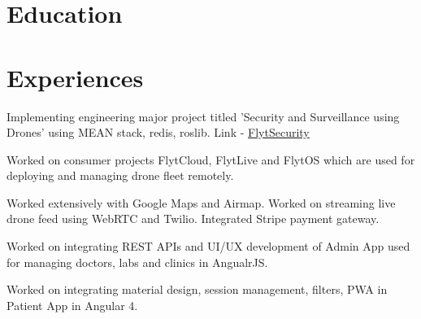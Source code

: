 \documentclass[]{deedy-resume-openfont}
\begin{document}
    \hfill
    \begin{minipage}[t]{0.66\textwidth} 
    
    
    \section{Education}
    
     \newline
    \vspace{\topsep}
    \sectionsep
    
    
    \sectionsep
    
    
    
    \section{Experiences}
    \vspace{3mm}
    \begin{tightemize}
    \item Implementing engineering major project titled 'Security and Surveillance using Drones' using MEAN stack, redis, roslib. Link - \href{https://flytsecurity.ai/}{FlytSecurity} 
     \item Worked on consumer projects FlytCloud, FlytLive and FlytOS which are used for deploying and managing drone fleet remotely. 
     \item Worked extensively with Google Maps and Airmap. Worked on streaming live drone feed using WebRTC and Twilio. Integrated Stripe payment gateway. \end{tightemize}
    
    
    \sectionsep
    
    \begin{tightemize}
     \item Worked on integrating REST APIs and UI/UX development of Admin App used for managing doctors, labs and clinics in AngualrJS. \item Worked on integrating material design, session management, filters, PWA in Patient App in Angular 4. \end{tightemize}
    

\end{minipage}
\end{document}
